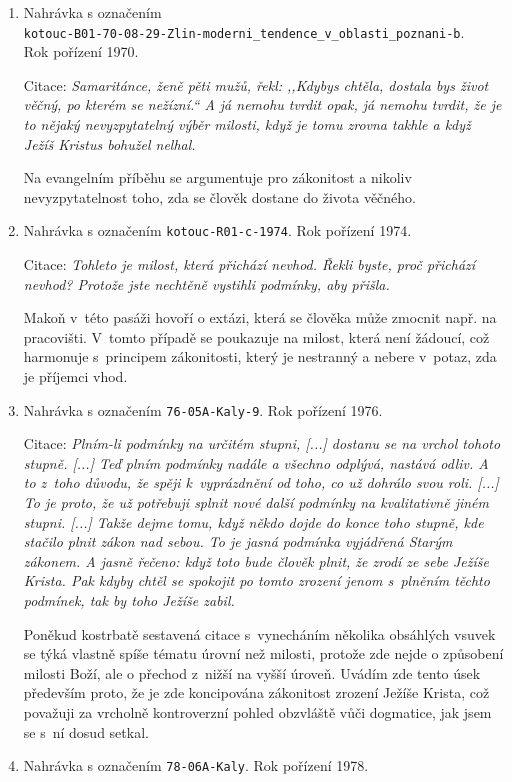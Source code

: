 \begin{enumerate}
  \item{
    Nahrávka s označením \\
    \texttt{kotouc-B01-70-08-29-Zlin-moderni\_tendence\_v\_oblasti\_poznani-b}. \\
    Rok pořízení 1970.

    Citace: \textit{%
      Samaritánce, ženě pěti mužů, řekl: ,,Kdybys chtěla, dostala bys život
      věčný, po kterém se nežízní.`` A já nemohu tvrdit opak, já nemohu tvrdit,
      že je to nějaký nevyzpytatelný výběr milosti, když je tomu zrovna takhle a
      když Ježíš Kristus bohužel nelhal.
    }

    Na evangelním příběhu se argumentuje pro zákonitost a nikoliv
    nevyzpytatelnost toho, zda se člověk dostane do života věčného.
  }
  \item{
    Nahrávka s označením \texttt{kotouc-R01-c-1974}.
    Rok pořízení 1974.

    Citace: \textit{%
      Tohleto je milost, která přichází nevhod. Řekli byste, proč přichází
      nevhod? Protože jste nechtěně vystihli podmínky, aby přišla.
    }

    Makoň v~této pasáži hovoří o extázi, která se člověka může zmocnit např. na
    pracovišti. V~tomto případě se poukazuje na milost, která není žádoucí, což
    harmonuje s~principem zákonitosti, který je nestranný a nebere v~potaz, zda
    je příjemci vhod.
  }
  \item{
    Nahrávka s označením \texttt{76-05A-Kaly-9}.
    Rok pořízení 1976.

    Citace: \textit{%
      Plním-li podmínky na určitém stupni, [...] dostanu se na vrchol tohoto
      stupně. [...] Teď plním podmínky nadále a všechno odplývá, nastává odliv.
      A to z~toho důvodu, že spěji k~vyprázdnění od toho, co už dohrálo svou
      roli. [...] To je proto, že už potřebuji splnit nové další podmínky na
      kvalitativně jiném stupni. [...] Takže dejme tomu, když někdo dojde do
      konce toho stupně, kde stačilo plnit zákon nad sebou. To je jasná podmínka
      vyjádřená Starým zákonem. A jasně řečeno: když toto bude člověk plnit, že
      zrodí ze sebe Ježíše Krista. Pak kdyby chtěl se spokojit po tomto zrození
      jenom s~plněním těchto podmínek, tak by toho Ježíše zabil.
    }

    Poněkud kostrbatě sestavená citace s~vynecháním několika obsáhlých vsuvek se
    týká vlastně spíše tématu úrovní než milosti, protože zde nejde o způsobení
    milosti Boží, ale o přechod z~nižší na vyšší úroveň. Uvádím zde tento úsek
    především proto, že je zde koncipována zákonitost zrození Ježíše Krista, což
    považuji za vrcholně kontroverzní pohled obzvláště vůči dogmatice, jak jsem
    se s~ní dosud setkal.
  }
  \item{
    Nahrávka s označením \texttt{78-06A-Kaly}.
    Rok pořízení 1978.

}
\end{enumerate}

